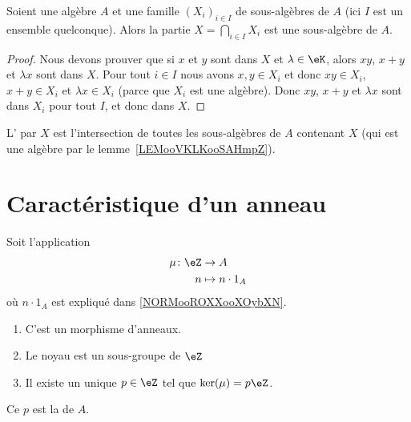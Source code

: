 \begin{lemma}   \label{LEMooVKLKooSAHmpZ}
	Soient une algèbre \( A\) et une famille \( (X_i)_{i\in I}\) de sous-algèbres de \( A\) (ici \( I\) est un ensemble quelconque). Alors la partie \( X=\bigcap_{i\in I}X_i\) est une sous-algèbre de \( A\).
\end{lemma}

\begin{proof}
	Nous devons prouver que si \( x\) et \( y\) sont dans \( X\) et \( \lambda\in \eK\), alors \( xy\), \( x+y\) et \( \lambda x\) sont dans \( X\). Pour tout \( i\in I\) nous avons \( x,y\in X_i\) et donc \( xy\in X_i\), \( x+y\in X_i\) et \( \lambda x\in X_i\) (parce que \( X_i\) est une algèbre). Donc \( xy\), \( x+y\) et \( \lambda x\) sont dans \( X_i\) pour tout \( I\), et donc dans \( X\).
\end{proof}

\begin{definition}\label{DefkAXaWY}
	L' par \( X\) est l'intersection de toutes les sous-algèbres de \( A\) contenant \( X\) (qui est une algèbre par le lemme~\ref{LEMooVKLKooSAHmpZ}).
\end{definition}


\section{Caractéristique d'un anneau}


\begin{lemmaDef}        \label{LEMDEFooVEWZooUrPaDw}
	Soit l'application
	\begin{equation}
		\begin{aligned}
			\mu\colon \eZ & \to A              \\
			n             & \mapsto n\cdot 1_A
		\end{aligned}
	\end{equation}
	où \( n\cdot 1_A\) est expliqué dans \ref{NORMooROXXooXOybXN}.
	\begin{enumerate}
		\item	\label{ITEMooPBWYooAWaCKJ}
		      C'est un morphisme d'anneaux.
		\item	\label{ITEMooOQWMooFYcmFf}
		      Le noyau est un sous-groupe de \( \eZ\)
		\item	\label{ITEMooWDWEooMSMxfN}
		      Il existe un unique \( p\in \eZ\) tel que \( \ker(\mu)=p\eZ\).
	\end{enumerate}
	Ce \( p\) est la  de \( A\).
\end{lemmaDef}

